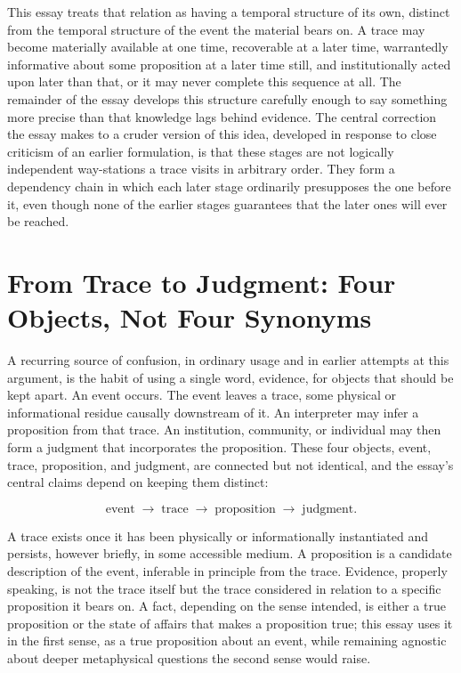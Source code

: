 \documentclass[11pt]{article}
\begin{document}
This essay treats that relation as having a temporal structure of its own, distinct from the temporal structure of the event the material bears on. A trace may become materially available at one time, recoverable at a later time, warrantedly informative about some proposition at a later time still, and institutionally acted upon later than that, or it may never complete this sequence at all. The remainder of the essay develops this structure carefully enough to say something more precise than that knowledge lags behind evidence. The central correction the essay makes to a cruder version of this idea, developed in response to close criticism of an earlier formulation, is that these stages are not logically independent way-stations a trace visits in arbitrary order. They form a dependency chain in which each later stage ordinarily presupposes the one before it, even though none of the earlier stages guarantees that the later ones will ever be reached.

\section{From Trace to Judgment: Four Objects, Not Four Synonyms}

A recurring source of confusion, in ordinary usage and in earlier attempts at this argument, is the habit of using a single word, evidence, for objects that should be kept apart. An event occurs. The event leaves a trace, some physical or informational residue causally downstream of it. An interpreter may infer a proposition from that trace. An institution, community, or individual may then form a judgment that incorporates the proposition. These four objects, event, trace, proposition, and judgment, are connected but not identical, and the essay's central claims depend on keeping them distinct:

\[
\text{event} \;\longrightarrow\; \text{trace} \;\longrightarrow\; \text{proposition} \;\longrightarrow\; \text{judgment}.
\]

A trace exists once it has been physically or informationally instantiated and persists, however briefly, in some accessible medium. A proposition is a candidate description of the event, inferable in principle from the trace. Evidence, properly speaking, is not the trace itself but the trace considered in relation to a specific proposition it bears on. A fact, depending on the sense intended, is either a true proposition or the state of affairs that makes a proposition true; this essay uses it in the first sense, as a true proposition about an event, while remaining agnostic about deeper metaphysical questions the second sense would raise.
\end{document}
